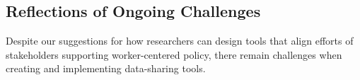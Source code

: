 \subsection{Reflections of Ongoing Challenges}
{Despite our suggestions for how researchers can design tools that align efforts of stakeholders supporting worker-centered policy, there remain challenges when creating and implementing data-sharing tools.}
